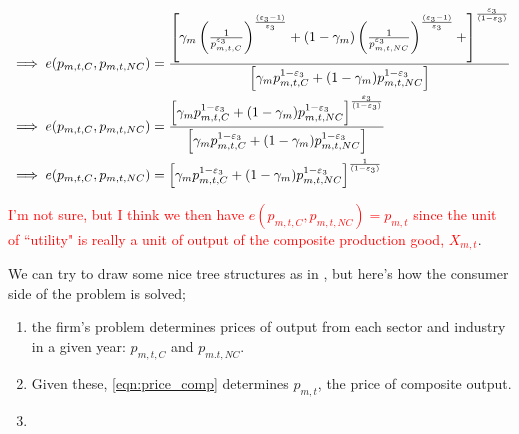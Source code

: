 \begin{equation}
\begin{split}
&\implies e(p_{m,t,C},p_{m,t,NC}) = 
\frac{\left[\gamma_{m}\left( \frac{1}{p_{m,t,C}^{\varepsilon_{3}}}\right)^{\frac{(\varepsilon_{3}-1)}{\varepsilon_{3}}}+(1-\gamma_{m})\left(\frac{1}{p_{m,t,NC}^{\varepsilon_{3}}}\right)^{\frac{(\varepsilon_{3}-1)}{\varepsilon_{3}}}+\right]^{\frac{\varepsilon_{3}}{(1-\varepsilon_{3})}}}{\left[\gamma_{m}p_{m,t,C}^{1-\varepsilon_{3}}+(1-\gamma_{m})p_{m,t,NC}^{1-\varepsilon_{3}}\right]}\\
&\implies e(p_{m,t,C},p_{m,t,NC}) = 
\frac{\left[\gamma_{m}p_{m,t,C}^{1-\varepsilon_{3}}+(1-\gamma_{m})p_{m,t,NC}^{1-\varepsilon_{3}}\right]^{\frac{\varepsilon_{3}}{(1-\varepsilon_{3})}}}{\left[\gamma_{m}p_{m,t,C}^{1-\varepsilon_{3}}+(1-\gamma_{m})p_{m,t,NC}^{1-\varepsilon_{3}}\right]}\\
&\implies e(p_{m,t,C},p_{m,t,NC}) = 
\left[\gamma_{m}p_{m,t,C}^{1-\varepsilon_{3}}+(1-\gamma_{m})p_{m,t,NC}^{1-\varepsilon_{3}}\right]^{\frac{1}{(1-\varepsilon_{3})}}\\
\end{split}
\end{equation}   

\textcolor{red}{I'm not sure, but I think we then have  $e(p_{m,t,C},p_{m,t,NC})=p_{m,t}$ since the unit of ``utility" is really a unit of output of the composite production good, $X_{m,t}$}.

We can try to draw some nice tree structures as in \citet{FR1993}, but here's how the consumer side of the problem is solved;
\begin{enumerate}
\item the firm's problem determines prices of output from each sector and industry in a given year: $p_{m,t,C}$ and $p_{m.t,NC}$.
\item Given these, \ref{eqn:price_comp} determines $p_{m,t}$, the price of composite output.
\item 
\end{enumerate}
    
    